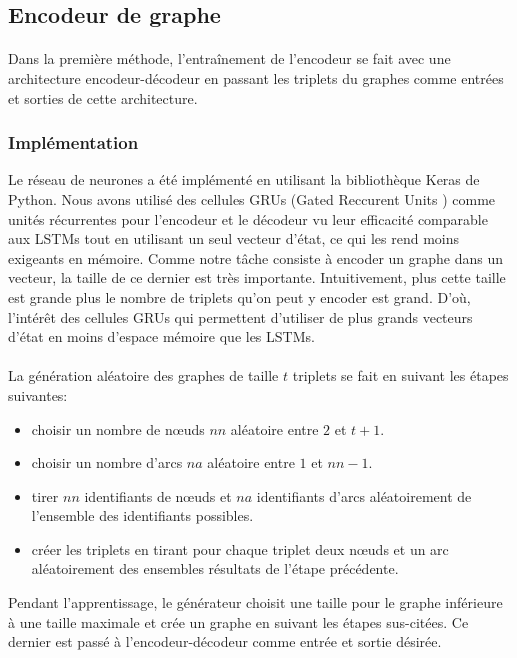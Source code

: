 \subsection{Encodeur de graphe}
\paragraph{}Dans la première méthode, l'entraînement de l'encodeur se fait avec une architecture encodeur-décodeur en passant les triplets du graphes comme entrées et sorties de cette architecture.
\subsubsection{Implémentation}
\par Le réseau de neurones a été implémenté en utilisant la bibliothèque Keras de Python. Nous avons utilisé des cellules GRUs (Gated Reccurent Units \cite{Cho2014}) comme unités récurrentes pour l'encodeur et le décodeur vu leur efficacité comparable aux LSTMs tout en utilisant un seul vecteur d'état, ce qui les rend moins exigeants en mémoire. Comme notre tâche consiste à encoder un graphe dans un vecteur, la taille de ce dernier est très importante. Intuitivement, plus cette taille est grande plus le nombre de triplets qu'on peut y encoder est grand. D'où, l'intérêt des cellules GRUs qui permettent d'utiliser de plus grands vecteurs d'état en moins d'espace mémoire que les LSTMs.
\paragraph{}La génération aléatoire des graphes de taille $t$ triplets se fait en suivant les étapes suivantes:
\begin{itemize}
	\item choisir un nombre de n\oe{}uds $nn$ aléatoire entre $2$ et $t+1$.
	\item choisir un nombre d'arcs $na$ aléatoire entre $1$ et $nn-1$.
	\item tirer $nn$ identifiants de n\oe{}uds et $na$ identifiants d'arcs aléatoirement de l'ensemble des identifiants possibles.
	\item créer les triplets en tirant pour chaque triplet deux n\oe{}uds et un arc aléatoirement des ensembles résultats de l'étape précédente. 
\end{itemize}
\par Pendant l'apprentissage, le générateur choisit une taille pour le graphe inférieure à une taille maximale et crée un graphe en suivant les étapes sus-citées. Ce dernier est passé à l'encodeur-décodeur comme entrée et sortie désirée.
